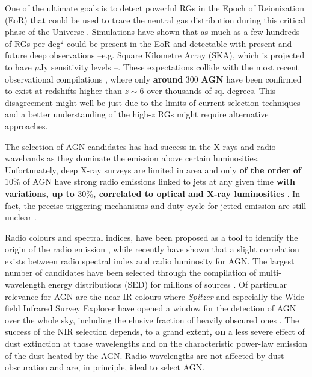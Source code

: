 \documentclass{aa}
\begin{document}
One of the ultimate goals is to detect powerful RGs in the Epoch of Reionization (EoR) that could be used to trace the neutral gas distribution during this critical phase of the Universe \citep[e.g.][]{2004NewAR..48.1029C, 2013MNRAS.435..460J}. Simulations  have shown that as much as a few hundreds of RGs per deg$^2$ could be present in the EoR \citep[][]{2019MNRAS.485.2694A, 2019MNRAS.482....2B, 2021MNRAS.503.3492T} and detectable with present and future deep observations --e.g. Square Kilometre Array (SKA), which is projected to have $\mu$Jy sensitivity levels \citep{2015aska.confE..67P}--. These expectations collide with the most recent observational compilations \citep[e.g.][]{2020ARA&A..58...27I, 2020MNRAS.494..789R, sarah_e_i_bosman_2022_6039724, 2022arXiv221206907F}, where only \textbf{around} $300$ \textbf{AGN} have been confirmed to exist at redshifts higher than $z{\sim}6$ over thousands of sq. degrees. This disagreement might well be just due to the limits of current selection techniques and a better understanding of the high-$z$ RGs might require alternative approaches.

The selection of AGN candidates has had success in the X-rays and radio wavebands as they dominate the emission above certain luminosities. Unfortunately, deep X-ray surveys are limited in area and only \textbf{of the order of} $10\%$ of AGN have strong radio emissions linked to jets at any given time \textbf{with variations, up to $30\%$, correlated to optical and X-ray luminosities} \citep[e.g.][]{1993MNRAS.263..461P, 1994ApJ...430..533D, 2019NatAs...3...48S, 2021MNRAS.506.5888M}. In fact, the precise triggering mechanisms and duty cycle for jetted emission are still unclear \citep{2015aska.confE..71A, 2022MNRAS.510.1163P}.

Radio colours and spectral indices, have been proposed as a tool to identify the origin of the radio emission \citep{2000A&A...354..423L}, while recently \citet{2019A&A...622A..17S} have shown that a  slight correlation exists between radio spectral index and radio luminosity for AGN.
The largest number of candidates have been selected through the compilation of multi-wavelength energy distributions (SED) for millions of sources \citep{2018ARA&A..56..625H, 2020PhDT.........3P}.  Of particular relevance for AGN are the near-IR colours where \textit{Spitzer} \citep{2004ApJS..154....1W} and especially  the Wide-field Infrared Survey Explorer \citep[\textit{WISE};][]{2010AJ....140.1868W} have opened a window for the detection of AGN over the whole sky, including the elusive fraction of heavily obscured ones \citep[e.g.][]{2012ApJ...753...30S, 2012MNRAS.426.3271M, 2017ApJ...836..182J, 2018ApJS..234...23A, 2021ApJ...922..179B}. The success of the NIR selection depends\textbf{,} to a grand extent\textbf{, on} a less severe effect of dust extinction at those wavelengths and on the characteristic power-law emission of the dust heated by the AGN. Radio wavelengths are not affected by dust obscuration and are, in principle, ideal to select AGN.
\end{document}

